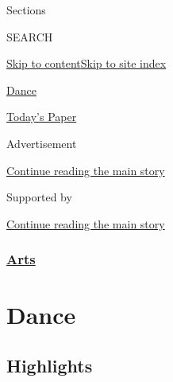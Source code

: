 Sections

SEARCH

\protect\hyperlink{site-content}{Skip to
content}\protect\hyperlink{site-index}{Skip to site index}

\href{https://www.nytimes.com/section/arts/dance}{Dance}

\href{https://myaccount.nytimes.com/auth/login?response_type=cookie\&client_id=vi}{}

\href{https://www.nytimes.com/section/todayspaper}{Today's Paper}

Advertisement

\protect\hyperlink{after-top}{Continue reading the main story}

Supported by

\protect\hyperlink{after-sponsor}{Continue reading the main story}

\hypertarget{arts}{%
\subsubsection{\texorpdfstring{\href{/section/arts}{Arts}}{Arts}}\label{arts}}

\hypertarget{dance}{%
\section{Dance}\label{dance}}

\hypertarget{highlights}{%
\subsection{Highlights}\label{highlights}}

